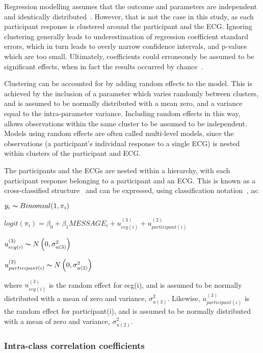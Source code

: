 Regression modelling assumes that the outcome and parameters are independent and identically distributed~\citep{goldstein_multilevel_2002}. However, that is not the case in this study, as each participant response is clustered around the participant and the ECG. Ignoring clustering generally leads to underestimation of regression coefficient standard errors, which in turn leads to overly narrow confidence intervals, and p-values which are too small. Ultimately, coefficients could erroneously be assumed to be significant effects, when in fact the results occurred by chance~\citep{clements_using_2007}.

Clustering can be accounted for by adding random effects to the model. This is achieved by the inclusion of a parameter which varies randomly between clusters, and is assumed to be normally distributed with a mean zero, and a variance equal to the intra-parameter variance. Including random effects in this way, allows observations within the same cluster to be assumed to be independent. Models using random effects are often called multi-level models, since the observations (a participant's individual response to a single ECG) is nested within clusters of the participant and ECG.

The participants and the ECGs are nested within a hierarchy, with each participant response belonging to a participant and an ECG. This is known as a cross-classified structure~\citep{leckie_cross-classified_2013} and can be expressed, using classification notation~\citep{browne_multiple_2001}, as:

$   y_i \thicksim Binomial(1,\pi_i)  $

$ logit(\pi_i) = \beta_0+\beta_1MESSAGE_i+u^{(3)}_{ecg(i)}+u^{(2)}_{participant(i)} $

$  u^{(3)}_{ecg(i)} \thicksim N\left(0,\sigma^2_{u(3)}\right)  $

$   u^{(2)}_{participant(i)} \thicksim N\left(0,\sigma^2_{u(2)}\right)  $

where $  u^{(3)}_{ecg(i)} $ is the random effect for ecg(i), and is assumed to be normally distributed with a mean of zero and variance, $ \sigma^2_{u(3)} $. Likewise, $  u^{(3)}_{participant(i)} $ is the random effect for participant(i), and is assumed to be normally distributed with a mean of zero and variance, $ \sigma^2_{u(2)} $.

\subsubsection{Intra-class correlation coefficients}
\label{intra-classcorrelationcoefficients}

